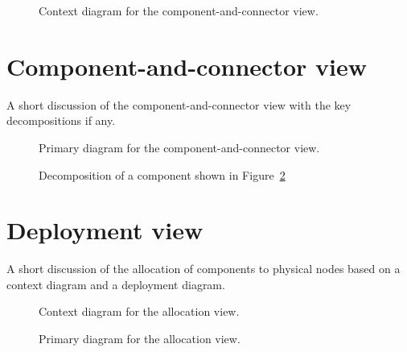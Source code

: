 \documentclass[english]{sareport}
\begin{document}
\begin{figure}[!htp]
	\centering
	\caption{Context diagram for the component-and-connector view.
	}\label{fig:cc_context}
\end{figure}

\section{Component-and-connector view}
A short discussion of the component-and-connector view with the key
decompositions if any.

\begin{figure}[!htp]
	\centering
	\caption{Primary diagram for the component-and-connector view.
	}\label{fig:cc_main}
\end{figure}

\begin{figure}[!htp]
	\centering
	\caption{Decomposition of a component shown in Figure~\ref{fig:cc_main}
	}\label{fig:decomp_decomp1}
\end{figure}

\section{Deployment view}
A short discussion of the allocation of components to physical nodes based on a
context diagram and a deployment diagram.

\begin{figure}[!htp]
	\centering
	\caption{Context diagram for the allocation view.}\label{fig:depl_context}
\end{figure}

\begin{figure}[!htp]
	\centering
	\caption{Primary diagram for the allocation view.}\label{fig:depl_main}
\end{figure}
\end{document}
